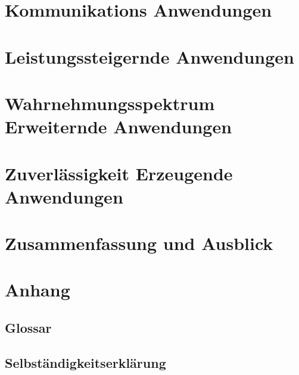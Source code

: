 \documentclass{llncs}					%
\begin{document}
\section{Kommunikations Anwendungen}

\section{Leistungssteigernde Anwendungen}

\section{Wahrnehmungsspektrum Erweiternde Anwendungen}

\section{Zuverlässigkeit Erzeugende Anwendungen}

\section{Zusammenfassung und Ausblick}

\section{Anhang}

\clearpage
\subsection{Glossar}\label{glossar}

\renewcommand*{\glossarysection}[2][]{}	%
\printnoidxglossaries				%

\subsection{Selbständigkeitserklärung}

\clearpage

\end{document}
